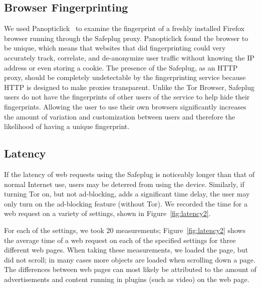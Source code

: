 \documentclass[letterpaper,twocolumn,10pt]{article}
\begin{document}
\subsection{Browser Fingerprinting}
We used Panopticlick~\cite{panopticlick} to examine the fingerprint of a freshly installed Firefox browser running through the Safeplug proxy.  Panopticlick found the browser to be unique, which means that websites that did fingerprinting could very accurately track, correlate, and de-anonymize user traffic without knowing the IP address or even storing a cookie.  The presence of the Safeplug, as an HTTP proxy, should be completely undetectable by the fingerprinting service because HTTP is designed to make proxies transparent.  Unlike the Tor Browser, Safeplug users do not have the fingerprints of other users of the service to help hide their fingerprints.  Allowing the user to use their own browsers significantly increases the amount of variation and customization between users and therefore the likelihood of having a unique fingerprint.

\subsection{Latency}
If the latency of web requests using the Safeplug is noticeably longer than that of normal Internet use, users may be deterred from using the device.  Similarly, if turning Tor on, but not ad-blocking, adds a significant time delay, the user may only turn on the ad-blocking feature (without Tor).  We recorded the time for a web request on a variety of settings, shown in Figure~\ref{fig:latency2}.


For each of the settings, we took 20 measurements; Figure~\ref{fig:latency2} shows the average time of a web request on each of the specified settings for three different web pages.  When taking these measurements, we loaded the page, but did not scroll; in many cases more objects are loaded when scrolling down a page.  The differences between web pages can most likely be attributed to the amount of advertisements and content running in plugins (such as video) on the web page.  
\end{document}

